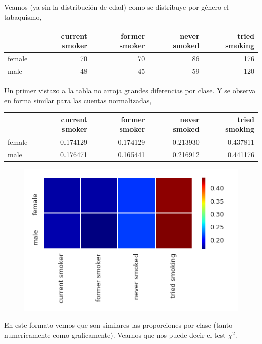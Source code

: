 \documentclass[8pt]{beamer}
\begin{document}
\begin{frame}
Veamos (ya sin la distribución de edad) como se distribuye por género el tabaquismo, 
\tiny{
\begin{table}
\begin{tabular}{lrrrr}
\toprule
{} &  current smoker &  former smoker &  never smoked &  tried smoking \\
\midrule
female &              70 &             70 &            86 &            176 \\
male   &              48 &             45 &            59 &            120 \\
\bottomrule
\end{tabular}
\end{table}
} 
\small{Un primer vistazo a la tabla no arroja grandes diferencias por clase. Y se observa en forma similar para las cuentas normalizadas,}
\tiny{
\begin{table}
\begin{tabular}{lrrrr}
\toprule
{} &  current smoker &  former smoker &  never smoked &  tried smoking \\
\midrule
female &        0.174129 &       0.174129 &      0.213930 &       0.437811 \\
male   &        0.176471 &       0.165441 &      0.216912 &       0.441176 \\
\bottomrule
\end{tabular}
\end{table} 
}
\begin{multicols}{2}
  \begin{figure}
 \includegraphics[scale=0.3]{smoking_heatmap}
 \end{figure}
 \columnbreak
\small{En este formato vemos que son similares las proporciones por clase (tanto numericamente como graficamente). Veamos que nos puede decir el test $\chi^2$.} 
\end{multicols}
\end{frame}
\end{document}
